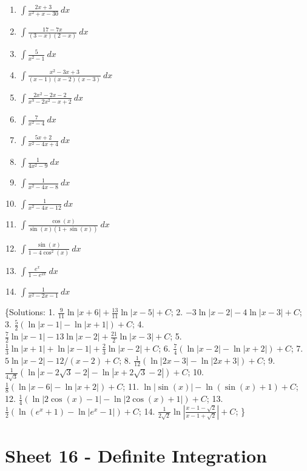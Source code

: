 \documentclass[
  english,
  11pt,
  oneside]{book}
\providecommand{\tightlist}{%
  \setlength{\itemsep}{0pt}\setlength{\parskip}{0pt}}
\newcommand{\slide}{}
\theoremstyle{definition}
\theoremstyle{definition}
\theoremstyle{definition}
\theoremstyle{definition}
\theoremstyle{remark}
\begin{document}
\begin{enumerate}
\def\labelenumi{\arabic{enumi}.}
\tightlist
\item
  \(\displaystyle\int \frac{2x+3}{x^2+x-30}\ dx\)
\item
  \(\displaystyle\int \frac{17-7x}{(3-x)(2-x)}\ dx\)
\item
  \(\displaystyle\int \frac{5}{x^2-1}\ dx\)
\item
  \(\displaystyle\int \frac{x^2-3x+3}{(x-1)(x-2)(x-3)}\ dx\)
\item
  \(\displaystyle\int \frac{2x^2-2x-2}{x^3-2x^2-x+2}\ dx\)
\item
  \(\displaystyle\int \frac{7}{x^2-4}\ dx\)
\item
  \(\displaystyle\int \frac{5x+2}{x^2-4x+4}\ dx\)
\item
  \(\displaystyle\int \frac{1}{4x^2-9}\ dx\)
\item
  \(\displaystyle\int \frac{1}{x^2-4x-8}\ dx\)
\item
  \(\displaystyle\int \frac{1}{x^2-4x-12}\ dx\)
\item
  \(\displaystyle\int \frac{\cos(x)}{\sin(x)(1+\sin(x))}\ dx\)
\item
  \(\displaystyle\int \frac{\sin(x)}{1-4\cos^2(x)}\ dx\)
\item
  \(\displaystyle\int \frac{e^x}{1-e^{2x}}\ dx\)
\item
  \(\displaystyle\int \frac{1}{x^2-2x-1}\ dx\)
\end{enumerate}

\{Solutions:
1. \(\frac{9}{11}\ln|x+6| + \frac{13}{11}\ln|x-5|+C\);
2. \(-3\ln|x-2|-4\ln|x-3| + C\);
3. \(\frac{5}{2}(\ln|x-1|-\ln|x+1|)+C\);
4. \(\frac{7}{2}\ln|x-1| -13\ln|x-2|+\frac{21}{2}\ln|x-3|+C\);
5. \(\frac{1}{3}\ln|x+1|+\ln|x-1|+\frac{2}{3}\ln|x-2|+C\);
6. \(\frac{7}{4}(\ln|x-2|-\ln|x+2|) +C\);
7. \(5\ln|x-2| - 12/(x-2) +C\);
8. \(\frac{1}{12}(\ln|2x-3|-\ln|2x+3|)+C\);
9. \(\frac{1}{4\sqrt{3}}\left( \ln|x-2\sqrt{3}-2| - \ln|x+2\sqrt{3}-2| \right)+C\);
10. \(\frac{1}{8}(\ln|x-6|-\ln|x+2|) +C\);
11. \(\ln|\sin(x)| - \ln(\sin(x)+1) + C\);
12. \(\frac{1}{4}\left( \ln|2\cos(x)-1| -\ln|2\cos(x)+1| \right) +C\);
13. \(\frac{1}{2}\left( \ln(e^x+1) - \ln|e^x-1| \right) + C\);
14. \(\frac{1}{2\sqrt{2}}\ln\left|\frac{x-1-\sqrt{2}}{x-1+\sqrt{2}}\right| +C\);
\}

\slide

\section{Sheet 16 - Definite Integration}\label{sheet-16---definite-integration}
\end{document}
